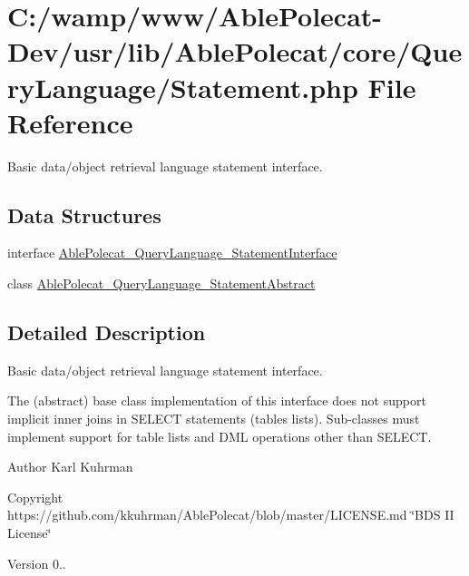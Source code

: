 \hypertarget{_statement_8php}{}\section{C\+:/wamp/www/\+Able\+Polecat-\/\+Dev/usr/lib/\+Able\+Polecat/core/\+Query\+Language/\+Statement.php File Reference}
\label{_statement_8php}


Basic data/object retrieval language statement interface.  


\subsection*{Data Structures}
\begin{DoxyCompactItemize}
\item 
interface \hyperlink{interface_able_polecat___query_language___statement_interface}{Able\+Polecat\+\_\+\+Query\+Language\+\_\+\+Statement\+Interface}
\item 
class \hyperlink{class_able_polecat___query_language___statement_abstract}{Able\+Polecat\+\_\+\+Query\+Language\+\_\+\+Statement\+Abstract}
\end{DoxyCompactItemize}


\subsection{Detailed Description}
Basic data/object retrieval language statement interface. 

The (abstract) base class implementation of this interface does not support implicit inner joins in S\+E\+L\+E\+C\+T statements (tables lists). Sub-\/classes must implement support for table lists and D\+M\+L operations other than S\+E\+L\+E\+C\+T.

\begin{DoxyAuthor}{Author}
Karl Kuhrman 
\end{DoxyAuthor}
\begin{DoxyCopyright}{Copyright}
https\+://github.com/kkuhrman/\+Able\+Polecat/blob/master/\+L\+I\+C\+E\+N\+S\+E.\+md \char`\"{}\+B\+D\+S I\+I License\char`\"{} 
\end{DoxyCopyright}
\begin{DoxyVersion}{Version}
0.. 
\end{DoxyVersion}
